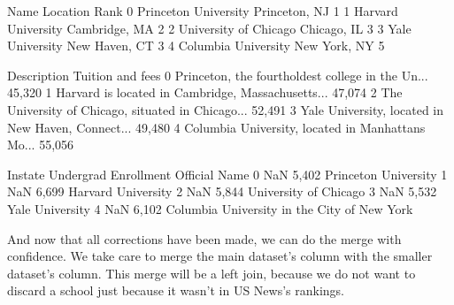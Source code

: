 \documentclass[letterpaper,10pt,english]{sphinxmanual}
\begin{document}
\begin{sphinxVerbatim}[commandchars=\\\{\}]
                    Name       Location  Rank  \PYGZbs{}
0   Princeton University  Princeton, NJ     1   
1     Harvard University  Cambridge, MA     2   
2  University of Chicago    Chicago, IL     3   
3        Yale University  New Haven, CT     3   
4    Columbia University   New York, NY     5   

                                         Description Tuition and fees  \PYGZbs{}
0  Princeton, the fourth\PYGZhy{}oldest college in the Un...         \PYGZdl{}45,320    
1  Harvard is located in Cambridge, Massachusetts...         \PYGZdl{}47,074    
2  The University of Chicago, situated in Chicago...         \PYGZdl{}52,491    
3  Yale University, located in New Haven, Connect...         \PYGZdl{}49,480    
4  Columbia University, located in Manhattan\PYGZsq{}s Mo...         \PYGZdl{}55,056    

  In\PYGZhy{}state Undergrad Enrollment                                Official Name  
0      NaN                5,402                         Princeton University  
1      NaN                6,699                           Harvard University  
2      NaN                5,844                        University of Chicago  
3      NaN                5,532                              Yale University  
4      NaN                6,102  Columbia University in the City of New York  
\end{sphinxVerbatim}

 And now that all corrections have been made, we can do the merge with confidence.  We take care to merge the main dataset’s  column with the smaller dataset’s  column.  This merge will be a left join, because we do not want to discard a school just because it wasn’t in US News’s rankings.

\begin{sphinxVerbatim}[commandchars=\\\{\}]
        
\end{sphinxVerbatim}
\end{document}

